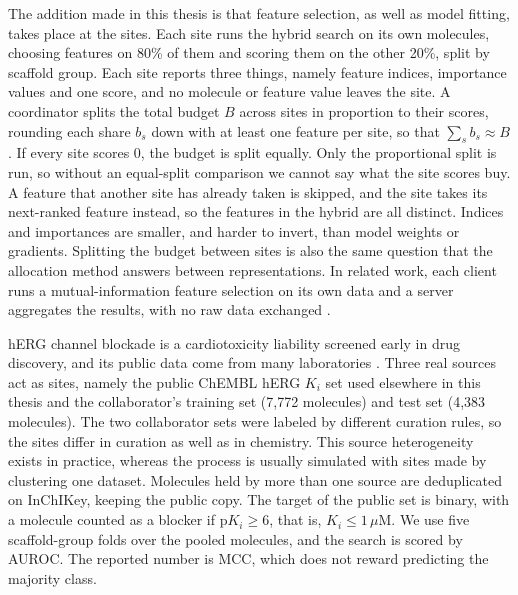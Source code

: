 The addition made in this thesis is that feature selection, as well as model fitting, takes place at the sites. Each site runs the hybrid search on its own molecules, choosing features on 80\% of them and scoring them on the other 20\%, split by scaffold group. Each site reports three things, namely feature indices, importance values and one score, and no molecule or feature value leaves the site. A coordinator splits the total budget $B$ across sites in proportion to their scores, rounding each share $b_s$ down with at least one feature per site, so that $\sum_s b_s \approx B$. If every site scores 0, the budget is split equally. Only the proportional split is run, so without an equal-split comparison we cannot say what the site scores buy. A feature that another site has already taken is skipped, and the site takes its next-ranked feature instead, so the features in the hybrid are all distinct. Indices and importances are smaller, and harder to invert, than model weights or gradients. Splitting the budget between sites is also the same question that the allocation method answers between representations. In related work, each client runs a mutual-information feature selection on its own data and a server aggregates the results, with no raw data exchanged \citep{Cassara2022}.

hERG channel blockade is a cardiotoxicity liability screened early in drug discovery, and its public data come from many laboratories \citep{Czodrowski2013}. Three real sources act as sites, namely the public ChEMBL hERG $K_i$ set used elsewhere in this thesis and the collaborator's training set (7,772 molecules) and test set (4,383 molecules). The two collaborator sets were labeled by different curation rules, so the sites differ in curation as well as in chemistry. This source heterogeneity exists in practice, whereas the process is usually simulated with sites made by clustering one dataset. Molecules held by more than one source are deduplicated on InChIKey, keeping the public copy. The target of the public set is binary, with a molecule counted as a blocker if $\mathrm{p}K_i \ge 6$, that is, $K_i \le 1\,\mu\mathrm{M}$. We use five scaffold-group folds over the pooled molecules, and the search is scored by AUROC. The reported number is MCC, which does not reward predicting the majority class.


